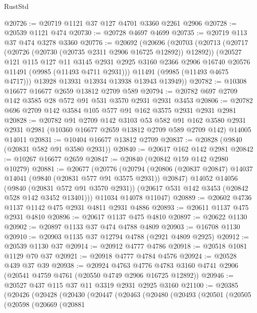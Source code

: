 \begin{lexlean}{RustStd}
\begin{coremodule}
@20726 := @20719 @1121 @37 @127 @4701 @3360 @2261 @2906
@20728 := @20539 @1121 @474
@20730 := @20728 @4697 @4699
@20735 := @20719 @113 @37 @474 @3278 @3360
@20776 := @20692
    (@20696
      (@20703
        (@20713
          (@20717 (@20726 (@20730 (@20735 @2311 @2906 @16725 @12892)) @12892))
          (@20527
            @121
            @115
            @127
            @11
            @3145
            @2931
            @2925
            @3160
            @2366
            @2906
            @16740
            @20576
            @11491
            (@9985 (@11493 @4711 @2931)))
          @11491
          (@9985 (@11493 @4675 @4717)))
        @13928
        @13931
        @13934
        @13938
        @13943
        @13949))
@20782 := @10308 @16677 @16677 @2659 @13812 @2709 @589
@20794 := @20782 @697 @2709 @142 @3585 @28 @572 @91 @531 @3570 @2931 @2931 @3453
@20806 := @20782 @696 @2709 @142 @3584 @105 @577 @91 @162 @3575 @2931 @2931 @2981
@20828 := @20782
    @91
    @2709
    @142
    @3103
    @53
    @582
    @91
    @162
    @3580
    @2931
    @2931
    @2981
    (@10360 @16677 @2659 @13812 @2709 @589 @2709 @142)
    @14005
    @14011
@20831 := @10404 @16677 @13812 @2709
@20837 := @20828 (@9840 (@20831 @582 @91 @3580 @2931))
@20840 := @20617 @162 @142 @2981
@20842 := @10267 @16677 @2659
@20847 := @20840 (@20842 @159 @142 @2980 @10279)
@20881 := @20677
    (@20776
      (@20794
        (@20806 (@20837 @20847) @14037 @14041 (@9840 (@20831 @577 @91 @3575 @2931)) @20847)
        @14052
        @14056
        (@9840 (@20831 @572 @91 @3570 @2931))
        (@20617 @531 @142 @3453 (@20842 @528 @142 @3452 @13401)))
      @11034
      @14078
      @11047)
@20889 := @20602 @4736 @1137 @1142 @475 @2931 @4811 @2931 @4886
@20893 := @20611 @1137 @475 @2931 @4810
@20896 := @20617 @1137 @475 @4810
@20897 := @20622 @1130
@20902 := @20897 @1133 @37 @474 @4788 @4809
@20903 := @16708 @1130
@20910 := @20903 @1135 @37 @12794 @4788 (@2921 @4809 @2925)
@20912 := @20539 @1130 @37
@20914 := @20912 @4777 @4786
@20918 := @20518 @1081 @1129 @70 @37
@20921 := @20918 @4777 @4784 @4576
@20924 := @20528 @439 @37 @39
@20938 := @20924
    @4763
    @4776
    @4783
    @3160
    @4741
    @2906
    (@20541 @4759 @4761 (@20550 @4749 @2906 @16725 @12892))
@20946 := @20527 @437 @115 @37 @11 @3319 @2931 @2925 @3160
@21100 := @20385
    (@20426
      (@20428
        (@20430
          (@20447
            (@20463
              (@20480
                (@20493
                  (@20501
                    (@20505
                      (@20598
                        (@20669
                          (@20881

\end{coremodule}
\end{lexlean}
